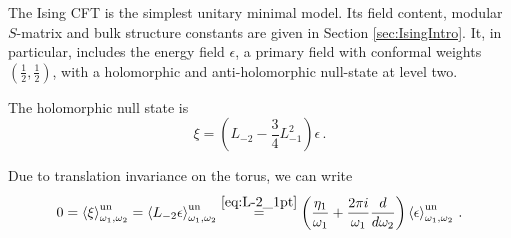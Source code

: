 \documentclass[11pt,a4paper]{article}
\numberwithin{equation}{section}
\begin{document}
The Ising CFT is the simplest unitary minimal model. Its field content, modular $S$-matrix and bulk structure constants are given in Section \ref{sec:IsingIntro}. It, in particular, includes the energy field $\epsilon$, a primary field with conformal weights $(\frac12,\frac12)$, with a holomorphic and anti-holomorphic null-state at level two. 

The holomorphic null state is 
\begin{equation}
    \xi=\left(L_{-2} - \frac{3}{4} L_{-1}^2\right) \epsilon\,.
\end{equation}

\noindent 
Due to translation invariance on the torus, we can write
%
\begin{equation}
    0 = \left\langle \xi \right\rangle_{\omega_1,\omega_2}^\mathrm{un} = \left\langle L_{-2}\epsilon \right\rangle_{\omega_1,\omega_2}^\mathrm{un} \stackrel{\eqref{eq:L-2_1pt}}{=} \left(\frac{ \eta_1}{\omega_1} + \frac{2 \pi i }{\omega_1} \frac{d}{d\omega_2}\right) \left\langle \epsilon \right\rangle_{\omega_1,\omega_2}^\mathrm{un}\,. \label{eq:epsDGL}
\end{equation}
\end{document}

